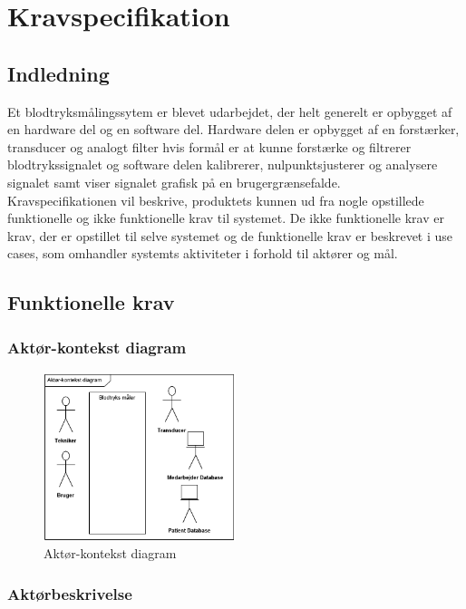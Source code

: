 \chapter{Kravspecifikation}




\section{Indledning}
 Et blodtryksmålingssytem er blevet udarbejdet, der helt generelt er opbygget af en hardware del og en software del. Hardware delen er opbygget af en forstærker, transducer og analogt filter hvis formål er at kunne forstærke og filtrerer blodtrykssignalet og software delen kalibrerer, nulpunktsjusterer og analysere signalet samt viser signalet grafisk på en brugergrænsefalde. \\
 Kravspecifikationen vil beskrive, produktets kunnen ud fra nogle opstillede funktionelle og ikke funktionelle krav til systemet. De ikke funktionelle krav er krav, der er opstillet til selve systemet og de funktionelle krav er beskrevet i use cases, som omhandler systemts aktiviteter i forhold til aktører og mål. 


\section{Funktionelle krav}
\subsection{Aktør-kontekst diagram}

\begin{figure}[H]
	\centering
	\includegraphics[width=0.5\textwidth]{Figurer/ISE/aktdiagram2}
	\caption{Aktør-kontekst diagram}
	\label{Aktdiagram}
\end{figure}


\subsection{Aktørbeskrivelse}

